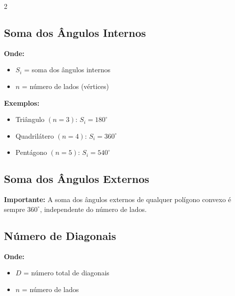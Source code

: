 \documentclass[11pt]{article}
\begin{document}
\begin{multicols}{2}
\subsection*{Soma dos Ângulos Internos}


\textbf{Onde:}
\begin{itemize}
\item $S_i$ = soma dos ângulos internos
\item $n$ = número de lados (vértices)
\end{itemize}

\textbf{Exemplos:}
\begin{itemize}
\item Triângulo $(n=3)$: $S_i = 180^\circ$
\item Quadrilátero $(n=4)$: $S_i = 360^\circ$
\item Pentágono $(n=5)$: $S_i = 540^\circ$
\end{itemize}

\subsection*{Soma dos Ângulos Externos}


\textbf{Importante:} A soma dos ângulos externos de qualquer polígono convexo é sempre $360^\circ$, independente do número de lados.

\subsection*{Número de Diagonais}


\textbf{Onde:}
\begin{itemize}
\item $D$ = número total de diagonais
\item $n$ = número de lados
\end{itemize}


\end{multicols}
\end{document}
